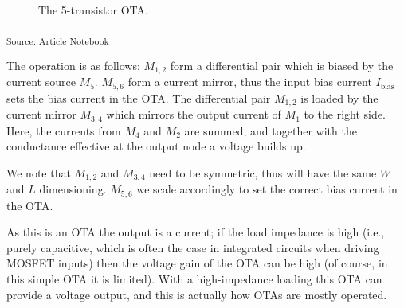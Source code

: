 \documentclass[
  a4paper,
  DIV=11,
  numbers=noendperiod]{scrartcl}
\begin{document}
\begin{figure}[H]


\caption{\label{fig-basic-ota}The 5-transistor OTA.}

\end{figure}%

\textsubscript{Source:
\href{https://iic-jku.github.io/analog-circuit-design/index.qmd.html}{Article
Notebook}}

The operation is as follows: \(M_{1,2}\) form a differential pair which
is biased by the current source \(M_5\). \(M_{5,6}\) form a current
mirror, thus the input bias current \(I_\mathrm{bias}\) sets the bias
current in the OTA. The differential pair \(M_{1,2}\) is loaded by the
current mirror \(M_{3,4}\) which mirrors the output current of \(M_1\)
to the right side. Here, the currents from \(M_4\) and \(M_2\) are
summed, and together with the conductance effective at the output node a
voltage builds up.

We note that \(M_{1,2}\) and \(M_{3,4}\) need to be symmetric, thus will
have the same \(W\) and \(L\) dimensioning. \(M_{5,6}\) we scale
accordingly to set the correct bias current in the OTA.

As this is an OTA the output is a current; if the load impedance is high
(i.e., purely capacitive, which is often the case in integrated circuits
when driving MOSFET inputs) then the voltage gain of the OTA can be high
(of course, in this simple OTA it is limited). With a high-impedance
loading this OTA can provide a voltage output, and this is actually how
OTAs are mostly operated.
\end{document}
